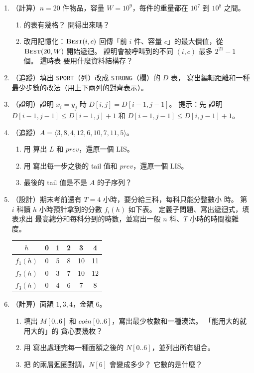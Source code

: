 \begin{enumerate}
\item \label{dp-q-sparse}（計算）$n = 20$ 件物品，容量 $W = 10^9$，每件的重量都在
$10^7$ 到 $10^8$ 之間。
\begin{enumerate}
\item {} 的表有幾格？ 開得出來嗎？
\item 改用記憶化：$\proc{Best}(i, c)$ 回傳「前 $i$ 件、容量 $c$」的最大價值，從
$\proc{Best}(20, W)$ 開始遞迴。 證明會被呼叫到的不同 $(i, c)$ 最多 $2^{21} - 1$ 個。 這時表
要用什麼資料結構存？
\end{enumerate}

\item \label{dp-q-edit}（追蹤）填出 \texttt{SPORT}（列）改成 \texttt{STRONG}（欄）的 $D$ 表，
寫出編輯距離和一種最少步數的改法（用上下兩列的對齊表示）。

\item \label{dp-q-edit-match}（證明）證明 $x_i = y_j$ 時 $D[i, j] = D[i-1, j-1]$。 提示：先
證明 $D[i-1, j-1] \le D[i-1, j] + 1$ 和 $D[i-1, j-1] \le D[i, j-1] + 1$。

\item \label{dp-q-lis}（追蹤）$A = \langle 3, 8, 4, 12, 6, 10, 7, 11, 5 \rangle$。
\begin{enumerate}
\item 用  算出 $L$ 和 $\mathit{prev}$，還原一個 LIS。
\item 用  寫出每一步之後的 tail 值和 $\mathit{prev}$，還原一個 LIS。
\item 最後的 tail 值是不是 $A$ 的子序列？
\end{enumerate}

\item \label{dp-q-alloc}（設計）期末考前還有 $T = 4$ 小時，要分給三科，每科只能分整數小
時。 第 $i$ 科讀 $h$ 小時預計拿到的分數 $f_i(h)$ 如下表。 定義子問題、寫出遞迴式，填表求出
最高總分和每科分到的時數，並寫出一般 $n$ 科、$T$ 小時的時間複雜度。
\begin{center}
\begin{tabular}{c*{5}{c}}
\toprule
$h$ & 0 & 1 & 2 & 3 & 4 \\
\midrule
$f_1(h)$ & 0 & 5 & 8 & 10 & 11 \\
$f_2(h)$ & 0 & 3 & 7 & 10 & 12 \\
$f_3(h)$ & 0 & 4 & 6 & 7 & 8 \\
\bottomrule
\end{tabular}
\end{center}

\item \label{dp-q-coin}（計算）面額 $1, 3, 4$，金額 $6$。
\begin{enumerate}
\item 填出 $M[0..6]$ 和 $\mathit{coin}[0..6]$，寫出最少枚數和一種湊法。 「能用大的就用大的」的
貪心要幾枚？
\item 用  寫出處理完每一種面額之後的 $N[0..6]$，並列出所有組合。
\item 把  的兩層迴圈對調，$N[6]$ 會變成多少？ 它數的是什麼？
\end{enumerate}


\end{enumerate}
